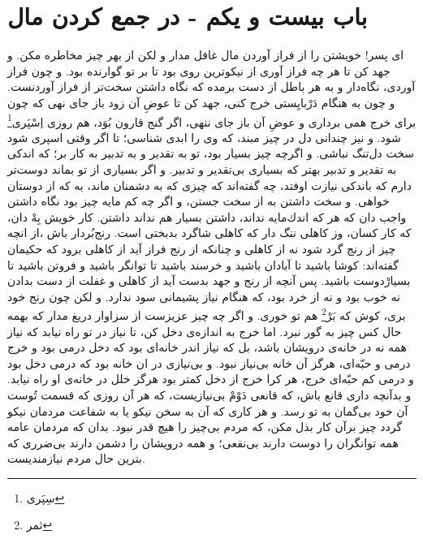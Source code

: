 \section*{باب بيست و يكم - 
در جمع كردن مال}

اى پسر! خويشتن را از فراز آوردن مال غافل مدار و لكن از بهر چيز مخاطره مكن. و جهد كن تا هر چه فراز آورى از نيكوترين روى بود تا بر تو گوارنده بود. و چون فراز آوردى، نگاه‌دار و به هر باطل از دست برمده كه نگاه داشتن سخت‌تر از فراز آوردنست. و چون به هنگام دَرْبايِستى خرج كنى، جهد كن تا عوضِ آن زود باز جاى نهى كه چون براى خرج همى بردارى و عوضِ آن باز جاى ننهى، اگر گنج قارون بُوَد، هم روزى اِسْپَرى\footnote{سِپَری} شود. و نيز چندانى دل در چيز مبند، كه وى را ابدى شناسى؛ تا اگر وقتى اسپرى شود سخت دل‌تنگ نباشى. و اگرچه چيز بسيار بود، تو به تقدير و به تدبير به كار بر؛ كه اندكى به تقدير و تدبير بهتر كه بسيارى بى‌تقدير و تدبير. و اگر بسيارى از تو بماند دوست‌تر دارم كه باندكى نيازت اوفتد، چه گفته‌اند كه چيزى كه به دشمنان ماند، به كه از دوستان خواهى. و سخت داشتن به از سخت جستن، و اگر چه كم مايه چيز بود نگاه داشتن واجب دان كه هر كه اندك‌مايه نداند، داشتن بسيار هم نداند داشتن. كار خويش بِهْ دان، كه كار كسان، وز كاهلى ننگ دار كه كاهلى شاگرد بدبختى است. رنج‌بُردار باش ،از انچه چيز از رنج گرد شود نه از كاهلى و چنانكه از رنج فراز آيد از كاهلى برود كه حكيمان گفته‌اند: كوشا باشيد تا آبادان باشيد و خرسند باشيد تا توانگر باشيد و فروتن باشيد تا بسيارْدوست باشيد. پس آنچه از رنج و جهد بدست آيد از كاهلى و غفلت از دست بدادن نه خوب بود و نه از خرد بود، كه هنگام نياز پشيمانى سود ندارد. و لكن چون رنج خود برى، كوش كه بَرْ\footnote{ثمر} هم تو خورى. و اگر چه چيز عزيزست از سزاوار دريغ مدار كه بهمه حال كس چيز به گور نبرد. اما خرج به اندازه‌ی دخل كن، تا نياز در تو راه نيابد كه نياز همه نه در خانه‌ی درويشان باشد، بل كه نياز اندر خانه‌اى بود كه دخل درمى بود و خرج درمى و حبّه‌اى، هرگز آن خانه بى‌نياز نبود. و بى‌نيازى در ان خانه بود كه درمى دخل بود و درمى كم حبّه‌اى خرج، هر كرا خرج از دخل كمتر بود هرگز خلل در خانه‌ی او راه نيابد. و بدآنچه دارى قانع باش، كه قانعى دَوْمْ بى‌نيازيست، كه هر آن روزى كه قسمت تُو‌ست آن خود بى‌گمان به تو رسد. و هر كارى كه آن به سخن نيكو يا به شفاعت مردمان نيكو گردد چيز برآن كار بذل مكن، كه مردم بى‌چيز را هيچ قدر نبود. بدان كه مردمان عامه همه توانگران را دوست دارند بى‌نفعى؛ و همه درويشان را دشمن دارند بى‌ضررى كه بترين حال مردم نيازمنديست. 

